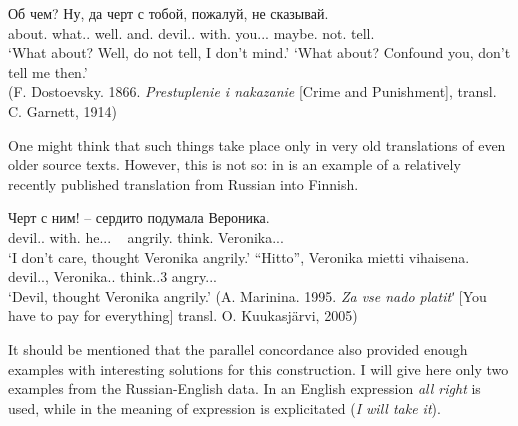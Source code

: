 \documentclass[output=paper]{langscibook}
\begin{document}
\ea
\gll Об чем? Ну, да черт с тобой, пожалуй, не сказывай.\\
     about.{\PREP} what.{\PRON}.{\LOC} well.{\PTCP} and.{\PTCP} devil.{\NOUN}.{\NOM} with.{\PREP} you.{\PRON}.{\INSTR}.{\SG} maybe.{\ADV} not.{\PTCP} tell.{\IMP}{\SG}\\
\glt `What about? Well, do not tell, I don’t mind.'
\glt `What about? Confound you, don’t tell me then.'\\(F. Dostoevsky. 1866. \textit{Prestuplenie i nakazanie} [Crime and Punishment], transl. C. Garnett, 1914)
\z

One might think that such things take place only in very old translations of even older source texts. However, this is not so: in  is an example of a relatively recently published translation from Russian into Finnish.

\ea\label{ex:mikhailov:15}
\gll Черт с ним! – сердито подумала Вероника.\\
     devil.{\NOUN}.{\NOM} with.{\PREP} he.{\PRON}.{\INSTR}.{\SG} ~ angrily.{\ADV} think.{\PAST}{\glossF}{\SG} Veronika.{\NOUNPROPER}.{\NOM}.\\
\glt `I don’t care, thought Veronika angrily.'
\ex
 \gll    ``Hitto'', Veronika mietti vihaisena.\\
     devil.{\NOUN}.{\NOM}, Veronika.{\NOUNPROPER}.{\NOM} think.{\PAST}.3{\SG} angry.{\ADJ}.{\ESS}.{\SG}\\
\glt `Devil, thought Veronika angrily.' (A. Marinina. 1995. \textit{Za vse nado platitʹ} [You have to pay for everything] transl. O. Kuukasjärvi, 2005)
\z

It should be mentioned that the parallel concordance also provided enough examples with interesting solutions for this construction. I will give here only two examples from the Russian-English data. In  an English expression \textit{all right} is used, while in  the meaning of expression is explicitated (\textit{I will take it}).
\end{document}
